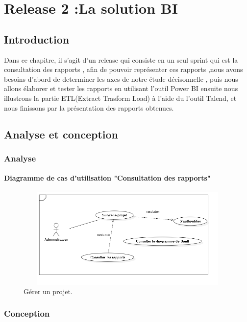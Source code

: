 \chapter{Release 2 :La solution BI }


\section{Introduction}

Dans ce chapitre, il s'agit d'un release qui consiste en un seul sprint qui est la consultation des rapports ,
afin de pouvoir repr\'{e}senter ces rapports ,nous avons besoins d'abord de determiner
les axes de notre \'{e}tude d\'{e}cisonnelle , puis nous allons \'{e}laborer et tester les rapports en utilisant l'outil Power BI
ensuite nous illustrons la partie ETL(Extract Trasform Load) \`{a} l'aide du l'outil Talend,
et nous finissons par la pr\'{e}sentation des rapports obtenues.

\section{ Analyse et conception}
\subsection{Analyse}


\subsubsection{ Diagramme de cas d'utilisation "Consultation des rapports"}

\begin{figure}[H]
\center
\includegraphics[width=12cm,height=5cm]{./figures/ucS.png}
\caption{G\'{e}rer un projet.}

\end{figure}

\subsection{Conception}


